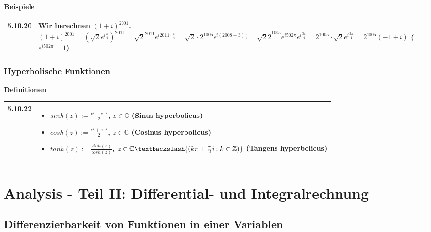     \noindent
    \textbf{Beispiele}
    
    \begin{longtable}{p{1cm} p{16cm}}
        \toprule

        5.10.20&Wir berechnen $(1+i)^{2001}$. \hfill \break
                $(1+i)^{2001} = (\sqrt{2}e^{i\frac{\pi}{4}})^{2011} = \sqrt{2}^{2011} e^{i2011\cdot \frac{\pi}{4}} =
                \sqrt{2} \cdot 2^{1005} e^{i(2008+3)\frac{\pi}{4}} = \sqrt{2} \dot 2^1005 e^{i502\pi}e^{i\frac{3\pi}{4}}= 
                2^{1005} \cdot \sqrt{2} e^{i\frac{3\pi}{4}} = 2^{1005} (-1+i)$ ($e^{i502\pi} =1$)\\

        \bottomrule
    \end{longtable}
    

\subsubsection{Hyperbolische Funktionen}

    \noindent
    \textbf{Definitionen}
      
    \begin{longtable}{p{1cm} p{16cm}}
        \toprule

        5.10.22&\begin{itemize}[topsep=-0.5cm]
                    \item[] $sinh(z) := \frac{e^z-e^{-z}}{2}$, $z \in \mathbb{C}$ (\textbf{Sinus hyperbolicus})
                    \item[] $cosh(z) := \frac{e^z+e^{-z}}{2}$, $z \in \mathbb{C}$ (\textbf{Cosinus hyperbolicus})
                    \item[] $tanh(z) := \frac{sinh(z)}{cosh(z)}$, $z \in \mathbb{C} \textbackslash \{(k\pi + \frac{\pi}{2}i: k \in \mathbb{Z})\}$ (\textbf{Tangens hyperbolicus})
                \end{itemize} \vspace{-0cm} \\

        \bottomrule

    \end{longtable}
    

    

\section{Analysis - Teil II: Differential- und Integralrechnung}
\subsection{Differenzierbarkeit von Funktionen in einer Variablen}
